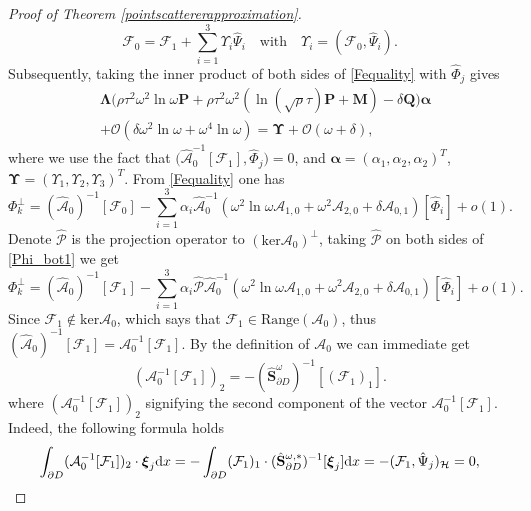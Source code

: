 \documentclass[10pt,reqno,oneside]{amsart}%
\theoremstyle{definition}
\theoremstyle{remark}
\numberwithin{equation}{section}
\numberwithin{equation}{section}
\begin{document}
\begin{proof}[Proof of Theorem \ref{pointscattererapproximation}]
$$
\mathcal{F}_0=\mathcal{F}_1+\sum_{i=1}^{3}\Upsilon_{i}\hat{\Psi}_{i}\quad \text{with}\quad \Upsilon_{i}=(\mathcal{F}_0,\hat{\Psi}_{i}).
$$
Subsequently, taking the inner product of both sides of \eqref{Fequality} with $\hat\Phi_j$ gives
\begin{align}\label{order}
	&\mathbf{\Lambda}\Big(\rho\tau^2\omega^2\ln\omega \mathbf{P}+\rho\tau^2\omega^2\left(\ln{(\sqrt{\rho}\tau)}\mathbf{P}+\mathbf{M}\right)
	-\delta \mathbf{Q}\Big)\boldsymbol{\alpha}\nonumber\\
	&+\mathcal{O}(\delta\omega^2\ln{\omega}+\omega^4\ln{\omega})=\mathbf{\Upsilon}+\mathcal{O}(\omega+\delta),
\end{align}
where we use the fact that $\Big({\hat{\mathcal{A}}}_0^{-1}[\mathcal{F}_{1}],\hat\Phi_j\Big)=0$, and $\boldsymbol{\alpha}=(\alpha_1,\alpha_2,\alpha_2)^T$, $\mathbf{\Upsilon}=(\Upsilon_{1},\Upsilon_{2},\Upsilon_{3})^T$. From \eqref{Fequality} one has
\begin{equation}\label{Phi_bot1}
	\Phi_k^{\bot}=(\hat{\mathcal{A}}_0)^{-1}[\mathcal{F}_0]-\sum_{i=1}^3 \alpha_i\hat{\mathcal{A}}_0^{-1}\left(\omega^2\ln\omega\mathcal{A}_{1,0}+\omega^2\mathcal{A}_{2,0}+\delta\mathcal{A}_{0,1}
	\right)[\hat{\Phi}_i]+o(1).
\end{equation}
Denote $\hat{\mathcal{P}}$ is the projection operator to $(\mathrm{ker}\mathcal{A}_0)^{\bot}$, taking $\hat{\mathcal{P}}$ on both sides of \eqref{Phi_bot1} we get
\begin{equation}
	\Phi_k^{\bot}=(\hat{\mathcal{A}}_0)^{-1}[\mathcal{F}_1]-\sum_{i=1}^3 \alpha_i \hat{\mathcal{P}} \hat{\mathcal{A}}_0^{-1}\left(\omega^2\ln\omega\mathcal{A}_{1,0}+\omega^2\mathcal{A}_{2,0}+\delta\mathcal{A}_{0,1}
	\right)[\hat{\Phi}_i]+o(1).
\end{equation}
Since $\mathcal{F}_1 \notin \mathrm{ker}\mathcal{A}_0$, which says that $\mathcal{F}_1\in \mathrm{Range}(\mathcal{A}_0)$, thus $(\hat{\mathcal{A}}_0)^{-1}[\mathcal{F}_1]={\mathcal{A}}_0^{-1}[\mathcal{F}_1]$. By the definition of $\mathcal{A}_0$ we can immediate get
\begin{equation}
	({\mathcal{A}}_0^{-1}[\mathcal{F}_1])_2=-(\hat{\mathbf{S}}_{\partial D}^{\omega})^{-1}[(\mathcal{F}_1)_1].
\end{equation}
where $({\mathcal{A}}_0^{-1}[\mathcal{F}_1])_2$ signifying the second component of the vector ${\mathcal{A}}_0^{-1}[\mathcal{F}_1]$.
Indeed, the following formula holds
\begin{equation}
	\int_{\partial D}({\mathcal{A}}_0^{-1}[\mathcal{F}_1])_2\cdot \boldsymbol{\xi}_j \mathrm{d}x=-\int_{\partial D}(\mathcal{F}_1)_1\cdot (\hat{\mathbf{S}}_{\partial D}^{\omega,*})^{-1}[\boldsymbol{\xi}_j] \mathrm{d}x=-(\mathcal{F}_1,\hat{\Psi}_j)_{\mathcal{H}}=0, \notag

\end{equation}
\end{proof}
\end{document}
